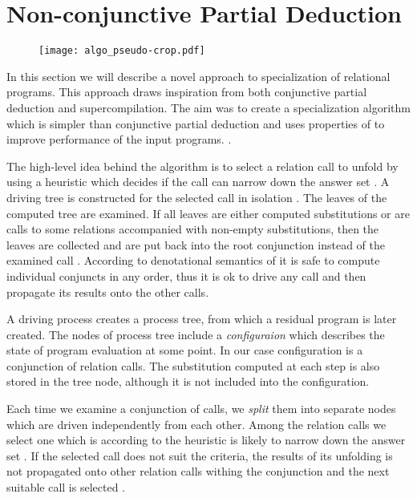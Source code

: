 \section{Non-conjunctive Partial Deduction}

\begin{figure}[!t]
  \centering
  \texttt{[image: algo\_pseudo-crop.pdf]}
  \caption{}
  \label{fig:ncpd-pseudo}
\end{figure}

In this section we will describe a novel approach to specialization of relational programs.
This approach draws inspiration from both conjunctive partial deduction and supercompilation.
The aim was to create a specialization algorithm which is simpler than conjunctive partial deduction and uses properties of \mk{} to improve performance of the input programs.
.

The high-level idea behind the algorithm is to select a relation call to unfold by using a heuristic which decides if the call can narrow down the answer set .
A driving tree is constructed for the selected call in isolation .
The leaves of the computed tree are examined.
If all leaves are either computed substitutions or are calls to some relations accompanied with non-empty substitutions, then the leaves are collected and are put back into the root conjunction instead of the examined call .
According to denotational semantics of \mk{} it is safe to compute individual conjuncts in any order, thus it is ok to drive any call and then propagate its results onto the other calls.

A driving process creates a process tree, from which a residual program is later created.
The nodes of process tree include a \emph{configuraion} which describes the state of program evaluation at some point.
In our case configuration is a conjunction of relation calls.
The substitution computed at each step is also stored in the tree node, although it is not included into the configuration.

Each time we examine a conjunction of calls, we \emph{split} them into separate nodes which are driven independently from each other.
Among the relation calls we select one which is according to the heuristic is likely to narrow down the answer set .
If the selected call does not suit the criteria, the results of its unfolding is not propagated onto other relation calls withing the conjunction and the next suitable call is selected .

